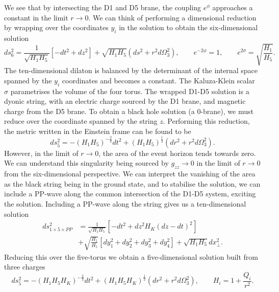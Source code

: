 We see that by intersecting the D1 and D5 brane, the coupling $e^{\phi}$ approaches a constant in the limit $r \rightarrow 0$. We can think of performing a dimensional reduction by wrapping over the coordinates $y_i$ in the solution  to obtain the six-dimensional solution \cite{Behrndt}
\begin{equation*}
	ds^2_{6} = \frac{1}{\sqrt{H_1 H_5}} \left[-dt^2 + dz^2 \right] + \sqrt{H_1 H_5} \left(ds^2 + r^2 d\Omega^2_3 \right), \qquad 	e^{-2\phi} = 1, \qquad e^{2\sigma} = \sqrt{\frac{H_1}{H_5}}.
\end{equation*}
The ten-dimensional dilaton is balanced by the determinant of the internal space spanned by the $y_i$ coordinates and becomes a constant. The Kaluza-Klein scalar $\sigma$ parametrises the volume of the four torus. The wrapped D1-D5 solution is a dyonic string, with an electric charge sourced by the D1 brane, and magnetic charge from the D5 brane. To obtain a black hole solution (a 0-brane), we must reduce over the coordinate spanned by the string $z$. Performing this reduction, the metric written in the Einstein frame can be found to be \cite{Mohaupt:2000gc}
\begin{equation*}
	ds^2_5 = -\left(H_1 H_5\right)^{-\frac{2}{3}}  dt^2 + \left(H_1 H_5\right)^{\frac{1}{3}} \left(dr^2 + r^2 d\Omega_3^2 \right).
\end{equation*}
However, in the limit of $r \rightarrow 0$, the area of the event horizon tends towards zero. We can understand this singularity being sourced by $g_{zz} \rightarrow 0$ in the limit of $r \rightarrow 0$ from the six-dimensional perspective. We can interpret the vanishing of the area as the black string being in the ground state, and to stabilise the solution, we can include a PP-wave along the common intersection of the D1-D5 system, exciting the solution. Including a PP-wave along the string gives us a ten-dimensional solution \cite{Maldacena:1996ky}
\begin{equation}
\label{eq:triplem5wave}
\begin{aligned}
	ds^2_{1 \times 5 \times PP} &= \frac{1}{\sqrt{H_1 H_5}} \left[-dt^2 + dz^2 H_K(dz - dt)^2 \right] \\
	&+ \sqrt{\frac{H_1}{H_5}} \left[dy_1^2 + dy_2^2 + dy_3^2 + dy_4^2 \right] + \sqrt{H_1 H_5} dx^2_\perp.
\end{aligned}
\end{equation}
Reducing this over the five-torus we obtain a five-dimensional solution built from three charges \cite{Mohaupt:2000gc}
\begin{equation*}
	ds^2_5 = -\left(H_1 H_5 H_K\right)^{-\frac{2}{3}}  dt^2 + \left(H_1 H_5 H_K\right)^{\frac{1}{3}} \left(dr^2 + r^2 d\Omega_3^2 \right), \qquad H_i = 1 + \frac{Q_i}{r^2}.
\end{equation*}
